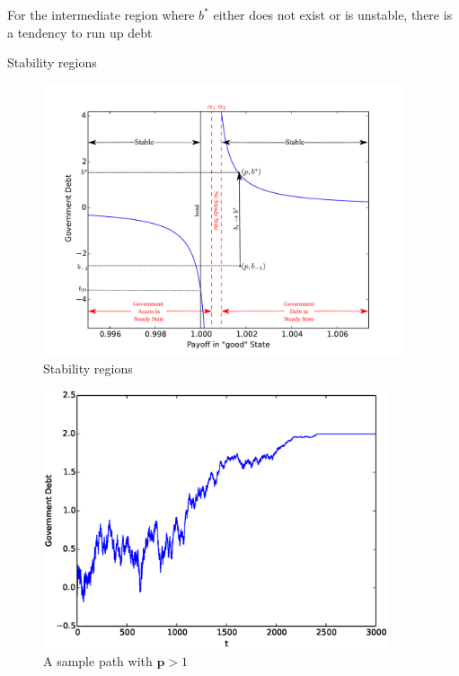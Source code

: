 \documentclass[12pt]{article}
\begin{document}
			For the intermediate region where  $b^*$ either does not exist or is unstable, there is a tendency to run up debt


{Stability regions}
	\begin{figure}
		\begin{center}
		\includegraphics[width = 4.2in]{Images/graph_stable.pdf}
\caption{Stability regions}
	\end{center}	
	\end{figure}	

\begin{figure}
	\begin{center}
	\includegraphics[width=4in]{Images/port1.eps}
    \caption{A sample path with  $\bm{p} > 1$}
	\end{center}
\end{figure}
\end{document}
